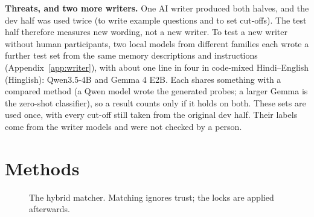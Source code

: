 \documentclass[sn-mathphys-num]{sn-jnl}
\begin{document}
\textbf{Threats, and two more writers.} One AI writer produced both halves, and the dev half was used twice (to write example questions and to
set cut-offs). The test half therefore measures new wording, not a new writer. To test a new writer without human participants, two local models
from different families each wrote a further test set from the same memory descriptions and instructions (Appendix~\ref{app:writer}), with about
one line in four in code-mixed Hindi--English (Hinglish): Qwen3.5-4B and Gemma 4 E2B. Each shares something with a compared method (a Qwen model
wrote the generated probes; a larger Gemma is the zero-shot classifier), so a result counts only if it holds on both. These sets are used once,
with every cut-off still taken from the original dev half. Their labels come from the writer models and were not checked by a person.

\section{Methods}\label{sec:method}

\begin{figure}[t]
\centering
{}
\caption{The hybrid matcher. Matching ignores trust; the locks are applied afterwards.}
\label{fig:method}
\end{figure}
\end{document}
